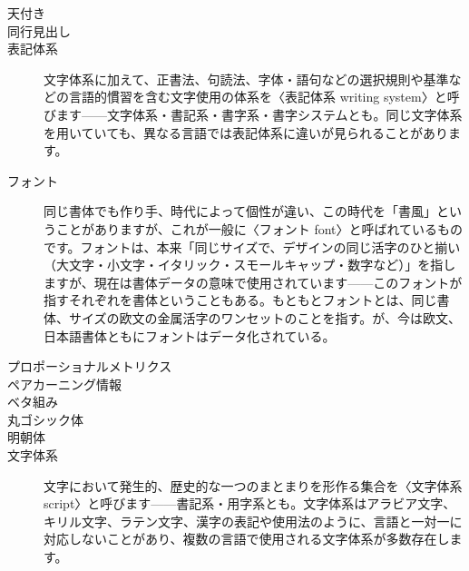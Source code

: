 \begin{description}
    \item[天付き]
    \item[同行見出し]
    \item[表記体系]文字体系に加えて、正書法、句読法、字体・語句などの選択規則や基準などの言語的慣習を含む文字使用の体系を〈表記体系 writing system〉と呼びます——文字体系・書記系・書字系・書字システムとも。同じ文字体系を用いていても、異なる言語では表記体系に違いが見られることがあります\cite{introduction_to_japanese_typesetting}。
    \item[フォント]同じ書体でも作り手、時代によって個性が違い、この時代を「書風」ということがありますが、これが一般に〈フォント font〉と呼ばれているものです。フォントは、本来「同じサイズで、デザインの同じ活字のひと揃い（大文字・小文字・イタリック・スモールキャップ・数字など）」を指しますが、現在は書体データの意味で使用されています——このフォントが指すそれぞれを書体ということもある\cite{introduction_to_japanese_typesetting}。もともとフォントとは、同じ書体、サイズの欧文の金属活字のワンセットのことを指す。が、今は欧文、日本語書体ともにフォントはデータ化されている\cite{mdn_201507}。
    \item[プロポーショナルメトリクス]
    \item[ペアカーニング情報]
    \item[ベタ組み]
    \item[丸ゴシック体]
    \item[明朝体]
    \item[文字体系]文字において発生的、歴史的な一つのまとまりを形作る集合を〈文字体系 script〉と呼びます——書記系・用字系とも。文字体系はアラビア文字、キリル文字、ラテン文字、漢字の表記や使用法のように、言語と一対一に対応しないことがあり、複数の言語で使用される文字体系が多数存在します\cite{introduction_to_japanese_typesetting}。
\end{description}


